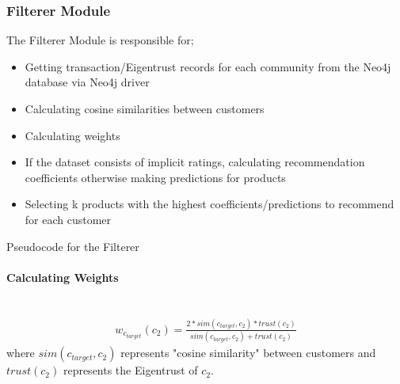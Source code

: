 	\subsubsection{Filterer Module} The Filterer Module is responsible for;
	\begin{itemize}
		\item Getting transaction/Eigentrust records for each community from the Neo4j database via Neo4j driver
		\item Calculating cosine similarities between customers
		\item Calculating weights
		\item If the dataset consists of implicit ratings, calculating recommendation coefficients otherwise making predictions for products
		\item Selecting k products with the highest coefficients/predictions to recommend for each customer
	\end{itemize}
	{
		\center
		\begin{algorithm}[H]
			\NoCaptionOfAlgo
			\SetAlgoLined
			\caption{Pseudocode for the Filterer}
		\end{algorithm}
	}

	\paragraph{Calculating Weights} \mbox{}\\
	\begin{equation*} 
	\begin{split}
	w_{c_{target}}(c_{2}) = \frac{2*sim(c_{target},c_{2})*trust(c_{2})}{sim(c_{target},c_{2})+trust(c_{2})}
	\end{split}
	\end{equation*}
	where $sim(c_{target},c_{2})$ represents "cosine similarity" between customers and $trust(c_{2})$ represents the Eigentrust of $c_{2}$.


